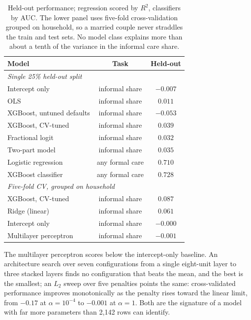 \documentclass[9pt,twoside]{pnas-new}
\begin{document}
\begin{table}[!ht]
\centering
\caption{Held-out performance; regression scored by $R^2$, classifiers by AUC.
The lower panel uses five-fold cross-validation grouped on household, so a
married couple never straddles the train and test sets. No model class explains
more than about a tenth of the variance in the informal care share.}
\label{tab:models}
\begin{tabular}{lcc}
\toprule
Model & Task & Held-out \\
\midrule
\multicolumn{3}{l}{\emph{Single 25\% held-out split}} \\
Intercept only            & informal share & $-0.007$ \\
OLS                       & informal share & $0.011$ \\
XGBoost, untuned defaults & informal share & $-0.053$ \\
XGBoost, CV-tuned         & informal share & $\mathbf{0.039}$ \\
Fractional logit          & informal share & $0.032$ \\
Two-part model            & informal share & $\mathbf{0.035}$ \\
Logistic regression       & any formal care & $0.710$ \\
XGBoost classifier        & any formal care & $\mathbf{0.728}$ \\
\midrule
\multicolumn{3}{l}{\emph{Five-fold CV, grouped on household}} \\
XGBoost, CV-tuned         & informal share & $\mathbf{0.087}$ \\
Ridge (linear)            & informal share & $0.061$ \\
Intercept only            & informal share & $-0.000$ \\
Multilayer perceptron     & informal share & $-0.001$ \\
\bottomrule
\end{tabular}
\end{table}

The multilayer perceptron scores below the intercept-only baseline. An
architecture search over seven configurations from a
single eight-unit layer to three stacked layers finds no configuration that
beats the mean, and the best is the smallest; an $L_2$ sweep over five penalties
points the same: cross-validated performance improves monotonically as the
penalty rises toward the linear limit, from $-0.17$ at $\alpha = 10^{-4}$ to
$-0.001$ at $\alpha = 1$. Both are the signature of a model with far more
parameters than 2{,}142 rows can identify.
\end{document}
